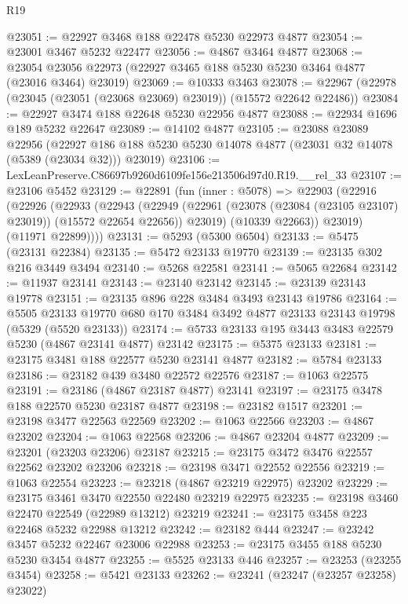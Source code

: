 \begin{lexlean}{R19}
\begin{coremodule}
@23051 := @22927 @3468 @188 @22478 @5230 @22973 @4877
@23054 := @23001 @3467 @5232 @22477
@23056 := @4867 @3464 @4877
@23068 := @23054 @23056 @22973 (@22927 @3465 @188 @5230 @5230 @3464 @4877 (@23016 @3464) @23019)
@23069 := @10333 @3463
@23078 := @22967 (@22978 (@23045 (@23051 (@23068 @23069) @23019)) (@15572 @22642 @22486))
@23084 := @22927 @3474 @188 @22648 @5230 @22956 @4877
@23088 := @22934 @1696 @189 @5232 @22647
@23089 := @14102 @4877
@23105 := @23088
    @23089
    @22956
    (@22927 @186 @188 @5230 @5230 @14078 @4877 (@23031 @32 @14078 (@5389 (@23034 @32))) @23019)
@23106 := LexLeanPreserve.C86697b9260d6109fe156e213506d97d0.R19.__rel_33
@23107 := @23106 @5452
@23129 := @22891
    (fun (inner : @5078) =>
    @22903
      (@22916
        (@22926
          (@22933
            (@22943
              (@22949
                (@22961 (@23078 (@23084 (@23105 @23107) @23019)) (@15572 @22654 @22656))
                @23019)
              (@10339 @22663))
            @23019)
          (@11971 @22899))))
@23131 := @5293 (@5300 @6504)
@23133 := @5475 (@23131 @22384)
@23135 := @5472 @23133 @19770
@23139 := @23135 @302 @216 @3449 @3494
@23140 := @5268 @22581
@23141 := @5065 @22684
@23142 := @11937 @23141
@23143 := @23140 @23142
@23145 := @23139 @23143 @19778
@23151 := @23135 @896 @228 @3484 @3493 @23143 @19786
@23164 := @5505
    @23133
    @19770
    @680
    @170
    @3484
    @3492
    @4877
    @23133
    @23143
    @19798
    (@5329 (@5520 @23133))
@23174 := @5733 @23133 @195 @3443 @3483 @22579 @5230 (@4867 @23141 @4877) @23142
@23175 := @5375 @23133
@23181 := @23175 @3481 @188 @22577 @5230 @23141 @4877
@23182 := @5784 @23133
@23186 := @23182 @439 @3480 @22572 @22576
@23187 := @1063 @22575
@23191 := @23186 (@4867 @23187 @4877) @23141
@23197 := @23175 @3478 @188 @22570 @5230 @23187 @4877
@23198 := @23182 @1517
@23201 := @23198 @3477 @22563 @22569
@23202 := @1063 @22566
@23203 := @4867 @23202
@23204 := @1063 @22568
@23206 := @4867 @23204 @4877
@23209 := @23201 (@23203 @23206) @23187
@23215 := @23175 @3472 @3476 @22557 @22562 @23202 @23206
@23218 := @23198 @3471 @22552 @22556
@23219 := @1063 @22554
@23223 := @23218 (@4867 @23219 @22975) @23202
@23229 := @23175 @3461 @3470 @22550 @22480 @23219 @22975
@23235 := @23198 @3460 @22470 @22549 (@22989 @13212) @23219
@23241 := @23175 @3458 @223 @22468 @5232 @22988 @13212
@23242 := @23182 @444
@23247 := @23242 @3457 @5232 @22467 @23006 @22988
@23253 := @23175 @3455 @188 @5230 @5230 @3454 @4877
@23255 := @5525 @23133 @446
@23257 := @23253 (@23255 @3454)
@23258 := @5421 @23133
@23262 := @23241 (@23247 (@23257 @23258) @23022)

\end{coremodule}
\end{lexlean}
